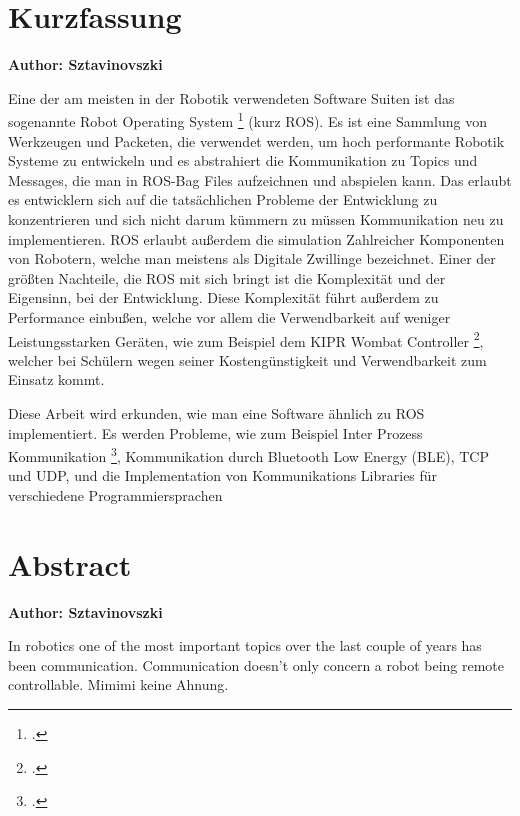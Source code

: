 \chapter{Kurzfassung}

\textbf{Author: Sztavinovszki}

\vspace{10mm}

Eine der am meisten in der Robotik verwendeten Software Suiten ist das sogenannte Robot Operating System \footcite{ros-site} (kurz ROS).
Es ist eine Sammlung von Werkzeugen und Packeten, die verwendet werden, um hoch performante Robotik Systeme zu entwickeln und es abstrahiert
die Kommunikation zu Topics und Messages, die man in ROS-Bag Files aufzeichnen und abspielen kann. Das erlaubt es entwicklern sich auf die tatsächlichen Probleme der Entwicklung zu konzentrieren und sich nicht darum kümmern zu müssen Kommunikation neu zu implementieren.
ROS erlaubt außerdem die simulation Zahlreicher Komponenten von Robotern, welche man meistens als Digitale Zwillinge bezeichnet.
Einer der größten Nachteile, die ROS mit sich bringt ist die Komplexität und der Eigensinn, bei der Entwicklung. Diese Komplexität führt außerdem zu Performance einbußen, welche vor allem die Verwendbarkeit auf weniger Leistungsstarken Geräten, wie zum Beispiel dem KIPR Wombat Controller \footcite{wombat-controller}, welcher bei Schülern wegen seiner Kostengünstigkeit und Verwendbarkeit zum Einsatz kommt.

\medskip

Diese Arbeit wird erkunden, wie man eine Software ähnlich zu ROS implementiert. Es werden Probleme, wie zum Beispiel Inter Prozess Kommunikation \footcite{ipc-begriff}, Kommunikation durch Bluetooth Low Energy (BLE), TCP und UDP, und die Implementation von Kommunikations Libraries für verschiedene Programmiersprachen


\chapter{Abstract}

\textbf{Author: Sztavinovszki}

\vspace{10mm}


In robotics one of the most important topics over the last couple of years has been communication. Communication doesn't only concern a robot being remote controllable. Mimimi keine Ahnung. 







